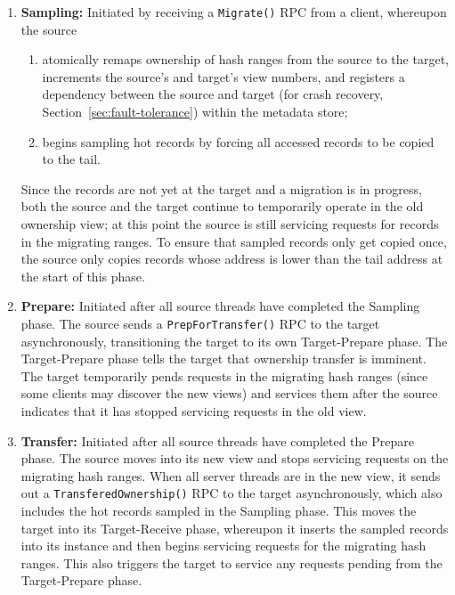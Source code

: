 \begin{enumerate}
\item {\bf Sampling:}
Initiated by receiving a \texttt{Migrate()} RPC from a client, whereupon the source
\begin{enumerate}
  \item atomically remaps ownership of hash ranges from the source to the
    target, increments the source's and target's view numbers, and registers a
    dependency between the source and target (for crash recovery,
    Section~\ref{sec:fault-tolerance}) within the metadata store;
  \item begins sampling hot records by forcing all accessed
    records to be copied to the \hlog tail.
\end{enumerate}

Since the records are not yet at the target and a migration is in
progress, both the source and the target continue to temporarily operate in the
old ownership view; at this point the source is still servicing requests for
records in the migrating ranges.
%
To ensure that sampled records only get copied once, the source only copies
records whose address is lower than the \hlog tail address at the start of this
phase.

\item {\bf Prepare:}
Initiated after all source threads have completed the Sampling phase.
%
The source sends a \texttt{PrepForTransfer()} RPC to the target asynchronously,
transitioning the target to its own Target-Prepare phase.
The Target-Prepare phase tells the target that ownership transfer is
imminent. The target temporarily pends requests in the migrating hash
ranges (since some clients may discover the new views) and
services them after the source indicates that it has stopped servicing
requests in the old view.

\item {\bf Transfer:}
Initiated after all source threads have completed the Prepare phase.
%
The source moves into its new view and stops servicing requests on the
migrating hash ranges.
%
When all server threads are in the new view, it sends out a
\texttt{TransferedOwnership()} RPC to the target asynchronously, which also
includes the hot records sampled in the Sampling phase.
%
This moves the target into its Target-Receive phase, whereupon it inserts the sampled
records into its \faster instance and then begins servicing requests for
the migrating hash ranges.
%
This also triggers the target to service any requests pending from the
Target-Prepare phase.


\end{enumerate}
